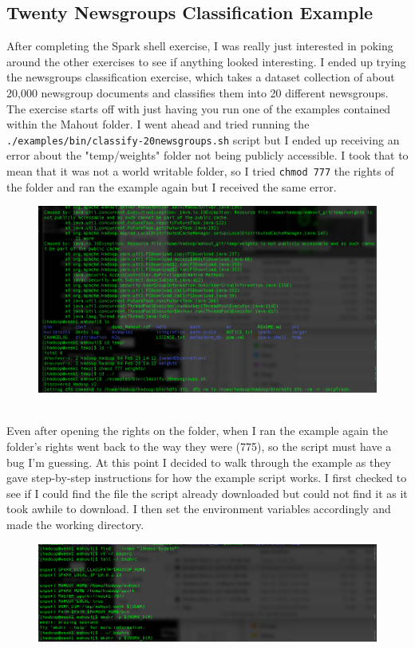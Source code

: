\documentclass[10pt]{article}
\begin{document}
\subsection*{Twenty Newsgroups Classification Example}
After completing the Spark shell exercise, I was really just interested in poking around the other exercises to see if anything looked interesting. I ended up trying the newsgroups classification exercise, which takes a dataset collection of about 20,000 newsgroup documents and classifies them into 20 different newsgroups. The exercise starts off with just having you run one of the examples contained within the Mahout folder. I went ahead and tried running the \verb|./examples/bin/classify-20newsgroups.sh| script but I ended up receiving an error about the "temp/weights" folder not being publicly accessible. I took that to mean that it was not a world writable folder, so I tried \verb|chmod 777| the rights of the folder and ran the example again but I received the same error. 
\begin{figure}[!h]
\includegraphics[scale=0.37]{classify1.png}
\centering
\end{figure}\\
\indent Even after opening the rights on the folder, when I ran the example again the folder's rights went back to the way they were (775), so the script must have a bug I'm guessing. At this point I decided to walk through the example as they gave step-by-step instructions for how the example script works. I first checked to see if I could find the file the script already downloaded but could not find it as it took awhile to download. I then set the environment variables accordingly and made the working directory.
\pagebreak
\begin{figure}[!h]
\includegraphics[scale=0.37]{classify2.png}
\centering
\end{figure}\\
\end{document}
